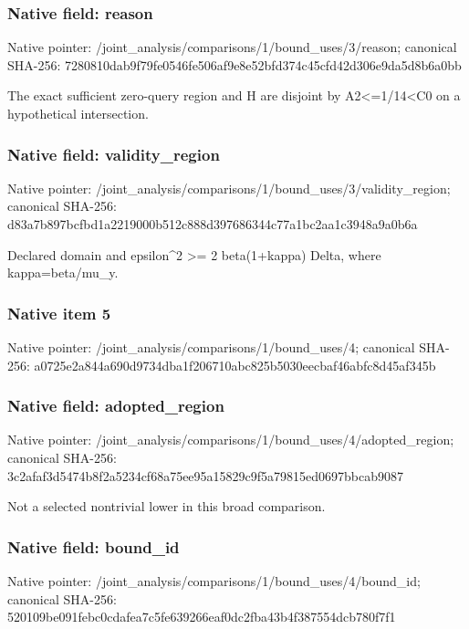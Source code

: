 \documentclass[10pt,a4paper]{article}
\begin{document}
\subsubsection{Native field: reason}
Native pointer: /joint\_\allowbreak{}analysis/comparisons/1/bound\_\allowbreak{}uses/3/reason; canonical SHA-256: 7280810dab9f79fe0546fe506af9e8e52bfd374c45cfd42d306e9da5d8b6a0bb

\begingroup\raggedright\sloppy The exact sufficient zero-query region and H are disjoint by A2<=\allowbreak{}1/\allowbreak{}14<C0 on a hypothetical intersection.\par\endgroup

\subsubsection{Native field: validity\_\allowbreak{}region}
Native pointer: /joint\_\allowbreak{}analysis/comparisons/1/bound\_\allowbreak{}uses/3/validity\_\allowbreak{}region; canonical SHA-256: d83a7b897bcfbd1a2219000b512c888d397686344c77a1bc2aa1c3948a9a0b6a

\begingroup\raggedright\sloppy Declared domain and epsilon\textasciicircum{}2 >=\allowbreak{} 2 beta(1+kappa) Delta,\allowbreak{} where kappa=\allowbreak{}beta/\allowbreak{}mu\_\allowbreak{}y.\par\endgroup

\subsubsection{Native item 5}
Native pointer: /joint\_\allowbreak{}analysis/comparisons/1/bound\_\allowbreak{}uses/4; canonical SHA-256: a0725e2a844a690d9734dba1f206710abc825b5030eecbaf46abfc8d45af345b

\subsubsection{Native field: adopted\_\allowbreak{}region}
Native pointer: /joint\_\allowbreak{}analysis/comparisons/1/bound\_\allowbreak{}uses/4/adopted\_\allowbreak{}region; canonical SHA-256: 3c2afaf3d5474b8f2a5234cf68a75ee95a15829c9f5a79815ed0697bbcab9087

\begingroup\raggedright\sloppy Not a selected nontrivial lower in this broad comparison.\par\endgroup

\subsubsection{Native field: bound\_\allowbreak{}id}
Native pointer: /joint\_\allowbreak{}analysis/comparisons/1/bound\_\allowbreak{}uses/4/bound\_\allowbreak{}id; canonical SHA-256: 520109be091febc0cdafea7c5fe639266eaf0dc2fba43b4f387554dcb780f7f1
\end{document}
